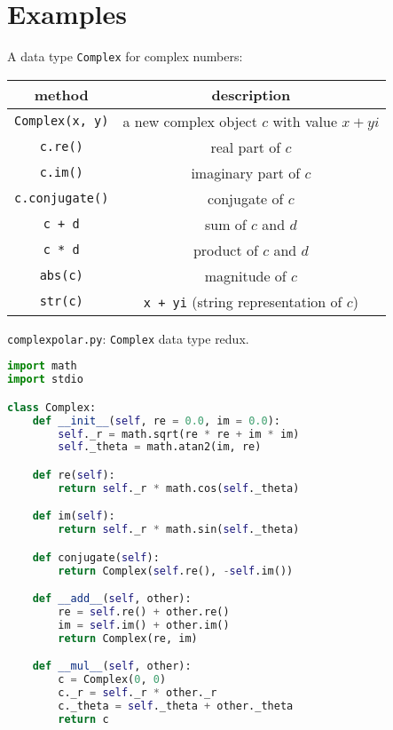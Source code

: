 \documentclass[8pt,a4paper,compress,handout]{beamer}
\begin{document}
\section{Examples}
\begin{frame}[fragile]
A data type \lstinline{Complex} for complex numbers:
\begin{center}
\begin{tabular}{cc}
method & description \\ \hline
\lstinline$Complex(x, y)$ & a new complex object $c$ with value $x + yi$ \\
\lstinline$c.re()$ & real part of $c$ \\
\lstinline$c.im()$ & imaginary part of $c$ \\
\lstinline$c.conjugate()$ & conjugate of $c$ \\
\lstinline$c + d$ & sum of $c$ and $d$ \\
\lstinline$c * d$ & product of $c$ and $d$ \\
\lstinline$abs(c)$ & magnitude of $c$ \\
\lstinline$str(c)$ & \lstinline$x + yi$ (string representation of $c$)
\end{tabular} 
\end{center}
\end{frame}

\begin{frame}[fragile]
\begin{framed}
\tiny \lstinline{complexpolar.py}: \lstinline{Complex} data type redux. 
\end{framed}

\begin{lstlisting}[language=Python]
import math
import stdio

class Complex:
    def __init__(self, re = 0.0, im = 0.0):
        self._r = math.sqrt(re * re + im * im)
        self._theta = math.atan2(im, re)

    def re(self):
        return self._r * math.cos(self._theta)

    def im(self):
        return self._r * math.sin(self._theta)

    def conjugate(self):
        return Complex(self.re(), -self.im())

    def __add__(self, other):
        re = self.re() + other.re()
        im = self.im() + other.im()
        return Complex(re, im)

    def __mul__(self, other):
        c = Complex(0, 0)
        c._r = self._r * other._r
        c._theta = self._theta + other._theta
        return c
\end{lstlisting}
\end{frame}
\end{document}
